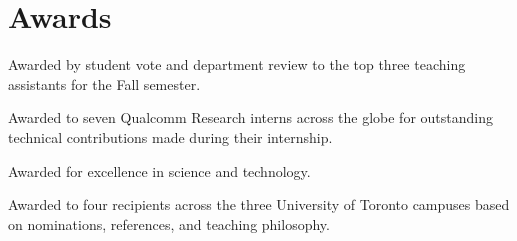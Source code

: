 \section{\sc Awards}

{
  Awarded by student vote and department review to the top three teaching assistants for the Fall semester.
}

{
  Awarded to seven Qualcomm Research interns across the globe for outstanding technical contributions made during their internship.
}

{
  Awarded for excellence in science and technology.
}

{
  Awarded to four recipients across the three University of Toronto campuses based on nominations, references, and teaching philosophy.
}
